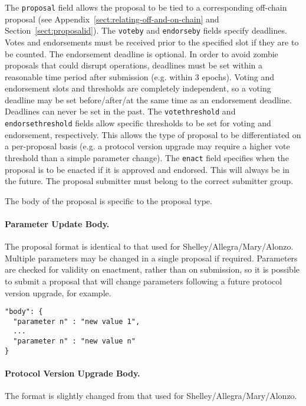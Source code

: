 The \texttt{proposal} field allows the proposal to be tied to a corresponding off-chain proposal (see Appendix~\ref{sect:relating-off-and-on-chain} and Section~\ref{sect:proposalid}).  The \texttt{voteby} and \texttt{endorseby} fields specify deadlines.
Votes and endorsements must be received prior to the specified slot if they are to be counted.  The endorsement deadline is optional.
In order to avoid zombie proposals that could disrupt operations, deadlines must be set within a reasonable time period after submission (e.g. within 3 epochs).
Voting and endorsement slots and thresholds are completely independent, so a voting deadline may be set before/after/at the same time as an endorsement deadline.
Deadlines can never be set in the past.
%
The \texttt{votethreshold} and \texttt{endorsethreshold} fields allow specific thresholds to be set for voting and endorsement, respectively.  This allows the type of proposal to be differentiated on a per-proposal basis
(e.g. a protocol version upgrade may require a higher vote threshold than a simple parameter change).
%
The \texttt{enact} field specifies when the proposal is to be enacted if it is approved and endorsed.  This will always be in the future.
%
The proposal submitter must belong to the correct submitter group.  

The body of the proposal is specific to the proposal type.

\newpage
\paragraph{Parameter Update Body.}  The proposal format is identical to that used for Shelley/Allegra/Mary/Alonzo.   Multiple parameters may be changed in a single proposal if required.
Parameters are checked for validity on enactment, rather than on submission, so it is possible to submit a proposal that will change parameters following a future protocol version upgrade, for example.


\begin{verbatim}
"body": {
  "parameter n" : "new value 1",
  ...
  "parameter n" : "new value n"
}
\end{verbatim}

\paragraph{Protocol Version Upgrade Body.}  The format is slightly changed from that used for Shelley/Allegra/Mary/Alonzo.


